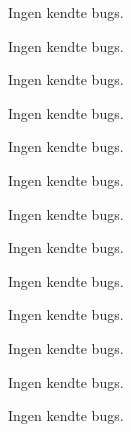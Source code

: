 
\begin{DoxyRefList}
\item[\label{bug__bug000001}%
\Hypertarget{bug__bug000001}%
File \hyperlink{Accelerometer_8h}{Accelerometer.h} ]Ingen kendte bugs. 

Ingen kendte bugs.  
\item[\label{bug__bug000003}%
\Hypertarget{bug__bug000003}%
File \hyperlink{lockUnit_8c}{lock\+Unit.c} ]Ingen kendte bugs.  
\item[\label{bug__bug000004}%
\Hypertarget{bug__bug000004}%
File \hyperlink{lockUnit_8h}{lock\+Unit.h} ]Ingen kendte bugs.  
\item[\label{bug__bug000005}%
\Hypertarget{bug__bug000005}%
File \hyperlink{main_8c}{main.c} ]Ingen kendte bugs.  
\item[\label{bug__bug000006}%
\Hypertarget{bug__bug000006}%
File \hyperlink{SPI_8c}{S\+PI.c} ]Ingen kendte bugs.  
\item[\label{bug__bug000007}%
\Hypertarget{bug__bug000007}%
File \hyperlink{SPI_8h}{S\+PI.h} ]Ingen kendte bugs. 

Ingen kendte bugs.  
\item[\label{bug__bug000008}%
\Hypertarget{bug__bug000008}%
File \hyperlink{SPIprotocol_8c}{S\+P\+Iprotocol.c} ]Ingen kendte bugs.  
\item[\label{bug__bug000009}%
\Hypertarget{bug__bug000009}%
File \hyperlink{SPIprotocol_8h}{S\+P\+Iprotocol.h} ]Ingen kendte bugs.  
\item[\label{bug__bug000010}%
\Hypertarget{bug__bug000010}%
File \hyperlink{UART_8c}{U\+A\+RT.c} ]Ingen kendte bugs.  
\item[\label{bug__bug000012}%
\Hypertarget{bug__bug000012}%
File \hyperlink{wheelSensor_8h}{wheel\+Sensor.h} ]Ingen kendte bugs. 

Ingen kendte bugs. 
\end{DoxyRefList}